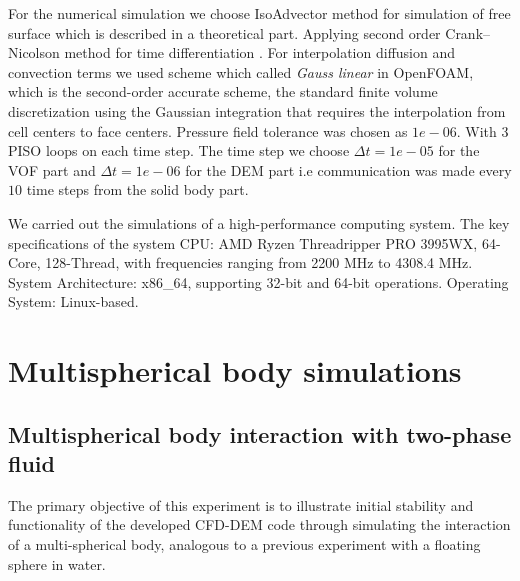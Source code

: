 For the numerical simulation we choose IsoAdvector \cite{roenby2019isoadvector} method for simulation of free surface which is described in a theoretical part. Applying second order Crank–Nicolson method for time differentiation . For interpolation  diffusion and convection terms we used scheme which called \textit{Gauss linear} in OpenFOAM, which is the second-order accurate scheme, the standard finite volume discretization using the Gaussian integration that requires the interpolation from cell centers to face centers. Pressure field tolerance was chosen as $1e-06$. With 3 PISO loops on each time step. The time step we choose $\Delta t = 1e-05$ for the VOF part and $\Delta t = 1e-06$ for the DEM part i.e communication was made every $10$ time steps from the solid body part.

We carried out the simulations of a high-performance computing system. The key specifications of the system CPU: AMD Ryzen Threadripper PRO 3995WX, 64-Core, 128-Thread, with frequencies ranging from 2200 MHz to 4308.4 MHz. System Architecture: x86\_64, supporting 32-bit and 64-bit operations. Operating System: Linux-based.
\section{Multispherical body simulations}

\subsection{Multispherical body interaction with two-phase fluid}

The primary objective of this experiment is to illustrate initial stability and functionality of the developed CFD-DEM code through simulating the interaction of a multi-spherical body, analogous to a previous experiment with a floating sphere in water.

